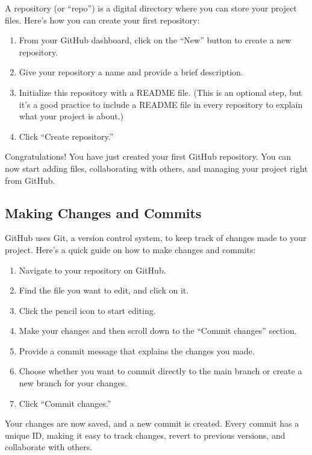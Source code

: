 \documentclass[a4paper,12pt]{book}
\begin{document}
A repository (or “repo”) is a digital directory where you can store your project files. Here’s how you can create your first repository:

\begin{enumerate}
    \item From your GitHub dashboard, click on the “New” button to create a new repository.
    \item Give your repository a name and provide a brief description.
    \item Initialize this repository with a README file. (This is an optional step, but it’s a good practice to include a README file in every repository to explain what your project is about.)
    \item Click “Create repository.”
\end{enumerate}

Congratulations! You have just created your first GitHub repository. You can now start adding files, collaborating with others, and managing your project right from GitHub.

\subsection*{Making Changes and Commits}

GitHub uses Git, a version control system, to keep track of changes made to your project. Here’s a quick guide on how to make changes and commits:

\begin{enumerate}
    \item Navigate to your repository on GitHub.
    \item Find the file you want to edit, and click on it.
    \item Click the pencil icon to start editing.
    \item Make your changes and then scroll down to the “Commit changes” section.
    \item Provide a commit message that explains the changes you made.
    \item Choose whether you want to commit directly to the main branch or create a new branch for your changes.
    \item Click “Commit changes.”
\end{enumerate}

Your changes are now saved, and a new commit is created. Every commit has a unique ID, making it easy to track changes, revert to previous versions, and collaborate with others.
\end{document}
